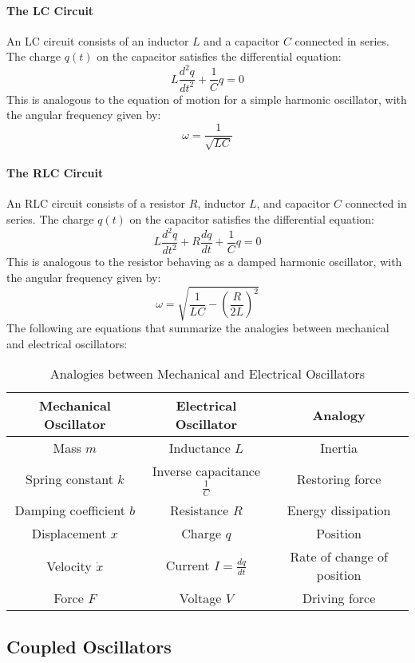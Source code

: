 \documentclass[11pt]{report}
\begin{document}
\paragraph{The LC Circuit} An LC circuit consists of an inductor \( L \) and a capacitor \( C \) connected in series. The charge \( q(t) \) on the capacitor satisfies the differential equation:
$$
    L\frac{d^2q}{dt^2} + \frac{1}{C}q = 0
$$
This is analogous to the equation of motion for a simple harmonic oscillator, with the angular frequency given by:
$$
    \omega = \frac{1}{\sqrt{LC}}
$$  

\paragraph{The RLC Circuit} An RLC circuit consists of a resistor \( R \), inductor \( L \), and capacitor \( C \) connected in series. The charge \( q(t) \) on the capacitor satisfies the differential equation:
$$
    L\frac{d^2q}{dt^2} + R\frac{dq}{dt} + \frac{1}{C}q = 0
$$
This is analogous to the resistor behaving as a damped harmonic oscillator, with the angular frequency given by:
$$
    \omega = \sqrt{\frac{1}{LC} - \left(\frac{R}{2L}\right)^2}
$$
The following are equations that summarize the analogies between mechanical and electrical oscillators:
\begin{table}[h!]
    \centering
    \begin{tabular}{|c|c|c|}
        \hline
        \textbf{Mechanical Oscillator} & \textbf{Electrical Oscillator} & \textbf{Analogy} \\
        \hline
        Mass \( m \) & Inductance \( L \) & Inertia \\
        Spring constant \( k \) & Inverse capacitance \( \frac{1}{C} \) & Restoring force \\
        Damping coefficient \( b \) & Resistance \( R \) & Energy dissipation \\
        Displacement \( x \) & Charge \( q \) & Position \\
        Velocity \( \dot{x} \) & Current \( I = \frac{dq}{dt} \) & Rate of change of position \\
        Force \( F \) & Voltage \( V \) & Driving force \\
        \hline
    \end{tabular}
    \caption{Analogies between Mechanical and Electrical Oscillators}
    \label{tab:oscillator_analogies}
\end{table}

\subsection{Coupled Oscillators}
\end{document}
